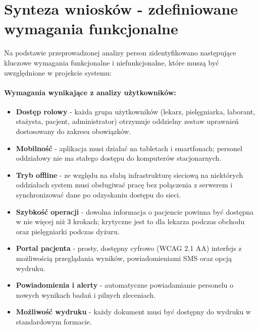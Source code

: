 \section{Synteza wniosków - zdefiniowane wymagania funkcjonalne}

Na podstawie przeprowadzonej analizy person zidentyfikowano następujące kluczowe wymagania funkcjonalne i niefunkcjonalne, które muszą być uwzględnione w projekcie systemu:

\paragraph{Wymagania wynikające z analizy użytkowników:}
\begin{itemize}
    \item \textbf{Dostęp rolowy} - każda grupa użytkowników (lekarz, pielęgniarka, laborant, stażysta, pacjent, administrator) otrzymuje oddzielny zestaw uprawnień dostosowany do zakresu obowiązków.
    \item \textbf{Mobilność} - aplikacja musi działać na tabletach i smartfonach; personel oddziałowy nie ma stałego dostępu do komputerów stacjonarnych.
    \item \textbf{Tryb offline} - ze względu na słabą infrastrukturę sieciową na niektórych oddziałach system musi obsługiwać pracę bez połączenia z serwerem i synchronizować dane po odzyskaniu dostępu do sieci.
    \item \textbf{Szybkość operacji} - dowolna informacja o pacjencie powinna być dostępna w nie więcej niż 3 krokach; krytyczne jest to dla lekarza podczas obchodu oraz pielęgniarki podczas dyżuru.
    \item \textbf{Portal pacjenta} - prosty, dostępny cyfrowo (WCAG 2.1 AA) interfejs z możliwością przeglądania wyników, powiadomieniami SMS oraz opcją wydruku.
    \item \textbf{Powiadomienia i alerty} - automatyczne powiadamianie personelu o nowych wynikach badań i pilnych zleceniach.
    \item \textbf{Możliwość wydruku} - każdy dokument musi być dostępny do wydruku w standardowym formacie.
\end{itemize}


